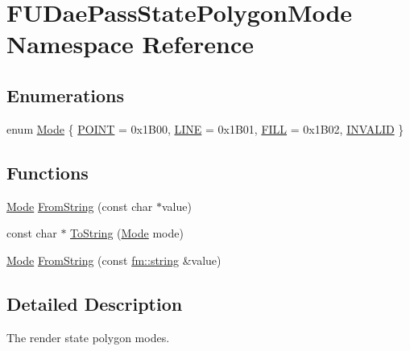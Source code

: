 \hypertarget{namespaceFUDaePassStatePolygonMode}{
\section{FUDaePassStatePolygonMode Namespace Reference}
\label{namespaceFUDaePassStatePolygonMode}
}
\subsection*{Enumerations}
\begin{DoxyCompactItemize}
\item 
enum \hyperlink{namespaceFUDaePassStatePolygonMode_a77c0933da4cc66394c4c3f6ff1044e9e}{Mode} \{ \hyperlink{namespaceFUDaePassStatePolygonMode_a77c0933da4cc66394c4c3f6ff1044e9eaa1b5414e1baa1e13b6c4142e67dae0b5}{POINT} =  0x1B00, 
\hyperlink{namespaceFUDaePassStatePolygonMode_a77c0933da4cc66394c4c3f6ff1044e9eab76f61d4eef9e7552fac90cd900994a2}{LINE} =  0x1B01, 
\hyperlink{namespaceFUDaePassStatePolygonMode_a77c0933da4cc66394c4c3f6ff1044e9ea1bcda2411d924f0b2594785c094f3734}{FILL} =  0x1B02, 
\hyperlink{namespaceFUDaePassStatePolygonMode_a77c0933da4cc66394c4c3f6ff1044e9eaa942c024efb610db5065c7c86a8fb7ca}{INVALID}
 \}
\end{DoxyCompactItemize}
\subsection*{Functions}
\begin{DoxyCompactItemize}
\item 
\hyperlink{namespaceFUDaePassStatePolygonMode_a77c0933da4cc66394c4c3f6ff1044e9e}{Mode} \hyperlink{namespaceFUDaePassStatePolygonMode_ae50a3298fb20738877cb051befa06c96}{FromString} (const char $\ast$value)
\item 
const char $\ast$ \hyperlink{namespaceFUDaePassStatePolygonMode_a0c453206db713d870cbadd76c7412a50}{ToString} (\hyperlink{namespaceFUDaePassStatePolygonMode_a77c0933da4cc66394c4c3f6ff1044e9e}{Mode} mode)
\item 
\hyperlink{namespaceFUDaePassStatePolygonMode_a77c0933da4cc66394c4c3f6ff1044e9e}{Mode} \hyperlink{namespaceFUDaePassStatePolygonMode_ac9da4bf2e73237b92e2f438573cd5102}{FromString} (const \hyperlink{classfm_1_1stringT}{fm::string} \&value)
\end{DoxyCompactItemize}


\subsection{Detailed Description}
The render state polygon modes. 

